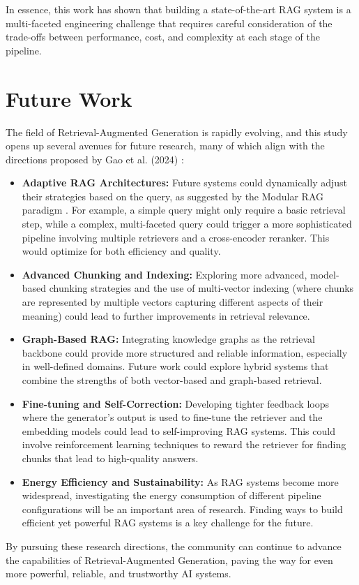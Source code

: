 In essence, this work has shown that building a state-of-the-art RAG system is a multi-faceted engineering challenge that requires careful consideration of the trade-offs between performance, cost, and complexity at each stage of the pipeline.

\section{Future Work}
The field of Retrieval-Augmented Generation is rapidly evolving, and this study opens up several avenues for future research, many of which align with the directions proposed by Gao et al. (2024) \autocite{gao2024retrievalaugmented}:
\begin{itemize}
    \item \textbf{Adaptive RAG Architectures:} Future systems could dynamically adjust their strategies based on the query, as suggested by the Modular RAG paradigm \autocite{gao2024retrievalaugmented}. For example, a simple query might only require a basic retrieval step, while a complex, multi-faceted query could trigger a more sophisticated pipeline involving multiple retrievers and a cross-encoder reranker. This would optimize for both efficiency and quality.
    \item \textbf{Advanced Chunking and Indexing:} Exploring more advanced, model-based chunking strategies and the use of multi-vector indexing (where chunks are represented by multiple vectors capturing different aspects of their meaning) could lead to further improvements in retrieval relevance.
    \item \textbf{Graph-Based RAG:} Integrating knowledge graphs as the retrieval backbone could provide more structured and reliable information, especially in well-defined domains. Future work could explore hybrid systems that combine the strengths of both vector-based and graph-based retrieval.
    \item \textbf{Fine-tuning and Self-Correction:} Developing tighter feedback loops where the generator's output is used to fine-tune the retriever and the embedding models could lead to self-improving RAG systems. This could involve reinforcement learning techniques to reward the retriever for finding chunks that lead to high-quality answers.
    \item \textbf{Energy Efficiency and Sustainability:} As RAG systems become more widespread, investigating the energy consumption of different pipeline configurations will be an important area of research. Finding ways to build efficient yet powerful RAG systems is a key challenge for the future.
\end{itemize}

By pursuing these research directions, the community can continue to advance the capabilities of Retrieval-Augmented Generation, paving the way for even more powerful, reliable, and trustworthy AI systems.
